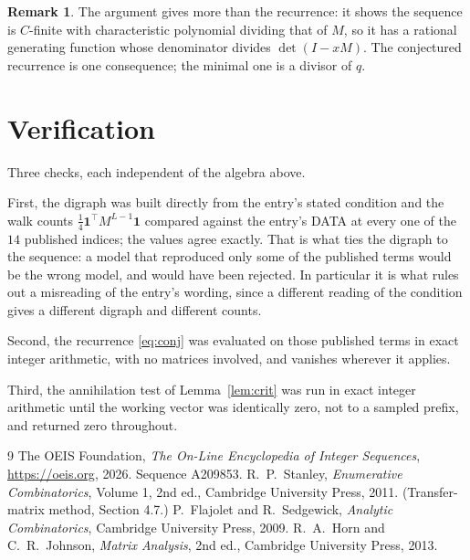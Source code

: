 \documentclass[11pt,a4paper]{article}
\theoremstyle{plain}
\theoremstyle{definition}
\newtheorem{remark}[theorem]{Remark}
\begin{document}
\begin{remark}
The argument gives more than the recurrence: it shows the sequence is $C$-finite with
characteristic polynomial dividing that of $M$, so it has a rational generating function
whose denominator divides $\det(I-xM)$. The conjectured recurrence is one consequence; the
minimal one is a divisor of $q$.
\end{remark}

\section{Verification}

Three checks, each independent of the algebra above.

First, the digraph was built directly from the entry's stated condition and the walk counts
$\tfrac1{4}\mathbf{1}^{\!\top}M^{L-1}\mathbf{1}$ compared against the entry's DATA at
every one of the $14$ published indices; the values agree exactly. That is what ties
the digraph to the sequence: a model that reproduced only some of the published terms would
be the wrong model, and would have been rejected. In particular it is what rules out a
misreading of the entry's wording, since a different reading of the condition gives a
different digraph and different counts.

Second, the recurrence \eqref{eq:conj} was evaluated on those published terms in exact
integer arithmetic, with no matrices involved, and vanishes wherever it applies.

Third, the annihilation test of Lemma~\ref{lem:crit} was run in exact integer arithmetic
until the working vector was identically zero, not to a sampled prefix, and returned zero
throughout.

\begin{thebibliography}{9}
 The OEIS Foundation, \emph{The On-Line Encyclopedia of Integer
Sequences}, \url{https://oeis.org}, 2026. Sequence A209853.
 R.~P.~Stanley, \emph{Enumerative Combinatorics}, Volume 1, 2nd ed.,
Cambridge University Press, 2011. (Transfer-matrix method, Section 4.7.)
 P.~Flajolet and R.~Sedgewick, \emph{Analytic Combinatorics}, Cambridge
University Press, 2009.
 R.~A.~Horn and C.~R.~Johnson, \emph{Matrix Analysis}, 2nd ed., Cambridge
University Press, 2013.
\end{thebibliography}
\end{document}

